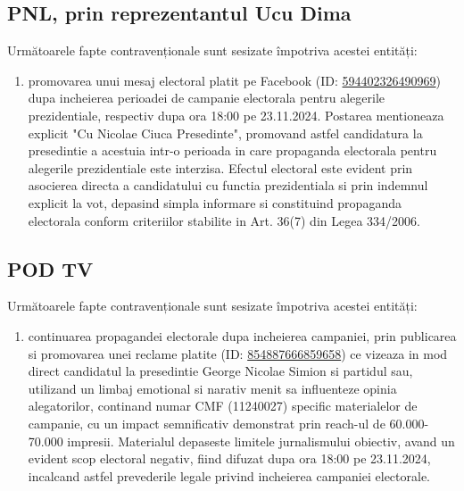 \documentclass[a4paper,12pt]{article}
\begin{document}
\subsection{PNL, prin reprezentantul Ucu Dima}
Următoarele fapte contravenționale sunt sesizate împotriva acestei entități:

\begin{enumerate}[leftmargin=*, label=\arabic*.)]
    \item promovarea unui mesaj electoral platit pe Facebook (ID: \href{https://www.facebook.com/ads/library/?id=594402326490969}{594402326490969}) dupa incheierea perioadei de campanie electorala pentru alegerile prezidentiale, respectiv dupa ora 18:00 pe 23.11.2024. Postarea mentioneaza explicit "Cu Nicolae Ciuca Presedinte", promovand astfel candidatura la presedintie a acestuia intr-o perioada in care propaganda electorala pentru alegerile prezidentiale este interzisa. Efectul electoral este evident prin asocierea directa a candidatului cu functia prezidentiala si prin indemnul explicit la vot, depasind simpla informare si constituind propaganda electorala conform criteriilor stabilite in Art. 36(7) din Legea 334/2006.
\end{enumerate}

\vspace{0.5cm}

\subsection{POD TV}
Următoarele fapte contravenționale sunt sesizate împotriva acestei entități:

\begin{enumerate}[leftmargin=*, label=\arabic*.)]
    \item continuarea propagandei electorale dupa incheierea campaniei, prin publicarea si promovarea unei reclame platite (ID: \href{https://www.facebook.com/ads/library/?id=854887666859658}{854887666859658}) ce vizeaza in mod direct candidatul la presedintie George Nicolae Simion si partidul sau, utilizand un limbaj emotional si narativ menit sa influenteze opinia alegatorilor, continand numar CMF (11240027) specific materialelor de campanie, cu un impact semnificativ demonstrat prin reach-ul de 60.000-70.000 impresii. Materialul depaseste limitele jurnalismului obiectiv, avand un evident scop electoral negativ, fiind difuzat dupa ora 18:00 pe 23.11.2024, incalcand astfel prevederile legale privind incheierea campaniei electorale.
\end{enumerate}
\end{document}
